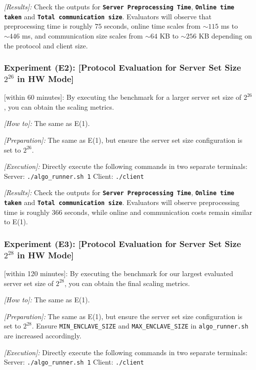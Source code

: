\documentclass[conference]{IEEEtran}
\begin{document}
\textit{[Results]:} Check the outputs for \textbf{\texttt{Server Preprocessing Time}}, \textbf{\texttt{Online time taken}} and \textbf{\texttt{Total communication size}}. Evaluators will observe that preprocessing time is roughly $75$ seconds, online time scales from $\sim 115$ ms to $\sim 446$ ms, and communication size scales from $\sim 64$ KB to $\sim 256$ KB depending on the protocol and client size.

\subsubsection{Experiment (E2): [Protocol Evaluation for Server Set Size $2^{26}$ in HW Mode]}
[within 60 minutes]: By executing the benchmark for a larger server set size of $2^{26}$, you can obtain the scaling metrics. 

\textit{[How to]:} The same as E(1).

\textit{[Preparation]:} The same as E(1), but ensure the server set size configuration is set to $2^{26}$.

\textit{[Execution]:} Directly execute the following commands in two separate terminals:
Server: \texttt{./algo\_runner.sh 1} 
Client: \texttt{./client} 

\textit{[Results]:} Check the outputs for \textbf{\texttt{Server Preprocessing Time}}, \textbf{\texttt{Online time taken}} and \textbf{\texttt{Total communication size}}. Evaluators will observe preprocessing time is roughly $366$ seconds, while online and communication costs remain similar to E(1).

\subsubsection{Experiment (E3): [Protocol Evaluation for Server Set Size $2^{28}$ in HW Mode]}
[within 120 minutes]: By executing the benchmark for our largest evaluated server set size of $2^{28}$, you can obtain the final scaling metrics. 

\textit{[How to]:} The same as E(1).

\textit{[Preparation]:} The same as E(1), but ensure the server set size configuration is set to $2^{28}$. Ensure \texttt{MIN\_ENCLAVE\_SIZE} and \texttt{MAX\_ENCLAVE\_SIZE} in \texttt{algo\_runner.sh} are increased accordingly.

\textit{[Execution]:} Directly execute the following commands in two separate terminals:
Server: \texttt{./algo\_runner.sh 1} 
Client: \texttt{./client} 
\end{document}

